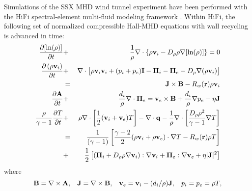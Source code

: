 
Simulations of the SSX MHD wind tunnel experiment have been performed with the HiFi spectral-element multi-fluid modeling framework \cite{Glasser04,Lukin08}.  Within HiFi, the following set of normalized compressible Hall-MHD equations with wall recycling is advanced in time:
\begin{eqnarray}
  \frac{\partial[\ln(\rho)]}{\partial t} &+& \frac{1}{\rho}\nabla\cdot
  \left\{\rho\mathbf{v}_i - D_\rho\rho\nabla[\ln(\rho)]\right\} = 0 
  \label{eq:Continuity}\\
  \frac{\partial\left(\rho\mathbf{v}_i\right)}{\partial t} &+&
  \nabla\cdot\left[\rho\mathbf{v}_i\mathbf{v}_i + (p_i + p_e)\mathbf{\bar{I}}
    - \mathbf{\Pi}_i -  \mathbf{\Pi}_e - D_\rho\nabla(\rho\mathbf{v}_i)\right] \nonumber \\ 
  &=& \mathbf{J}\times\mathbf{B} - R_w(\mathbf{r})\rho\mathbf{v}_i
  \label{eq:Momentum}\\
  \frac{\partial\mathbf{A}}{\partial t} &+& \frac{d_i}{\rho}\nabla\cdot\mathbf{\Pi}_e = \mathbf{v}_e\times\mathbf{B} + \frac{d_i}{\rho}\nabla p_e - \eta\mathbf{J} 
  \label{eq:OhmsLaw} \\
 \frac{\rho}{\gamma-1}\frac{\partial T}{\partial t} &+& \rho\nabla\cdot\left[\frac{1}{2}(\mathbf{v}_i + \mathbf{v}_e)T\right] 
    -  \nabla\cdot\mathbf{q} - \frac{1}{\rho}\nabla\cdot\left[\frac{D_\rho\rho^2}{\gamma-1}\nabla T\right]  \nonumber \\
    &=& \frac{1}{(\gamma-1)}\left[\frac{\gamma-2}{2}(\rho\mathbf{v}_i + \rho\mathbf{v}_e)\cdot\nabla T - R_w(\mathbf{r}) \rho T\right] \nonumber \\
    &+& \frac{1}{2}\left[\left(\mathbf{\Pi}_i + D_\rho\rho\nabla\mathbf{v}_i\right):\nabla\mathbf{v}_i + \mathbf{\Pi}_e:\nabla\mathbf{v}_e + \eta|\mathbf{J}|^2 \right]
    \label{eq:Tempr}
 \end{eqnarray}
where
\begin{equation*}
  \mathbf{B} = \nabla\times\mathbf{A}, \hspace{3mm} \mathbf{J} = \nabla\times\mathbf{B}, \hspace{3mm} \mathbf{v}_e = \mathbf{v}_i - (d_i/\rho)\mathbf{J}, \hspace{3mm} p_i = p_e = \rho T,
\end{equation*}
